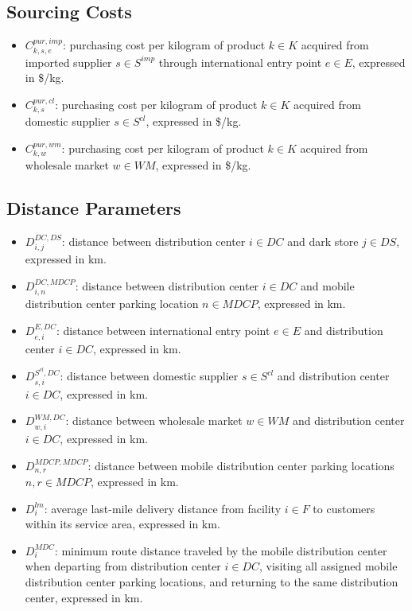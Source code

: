 \documentclass[12pt]{article}
\begin{document}
\subsection{Sourcing Costs}

\begin{itemize}
    \item $C^{pur,imp}_{k,s,e}$: purchasing cost per kilogram of product $k \in K$ acquired from imported supplier $s \in S^{imp}$ through international entry point $e \in E$, expressed in \$/kg.

    \item $C^{pur,cl}_{k,s}$: purchasing cost per kilogram of product $k \in K$ acquired from domestic supplier $s \in S^{cl}$, expressed in \$/kg.

    \item $C^{pur,wm}_{k,w}$: purchasing cost per kilogram of product $k \in K$ acquired from wholesale market $w \in WM$, expressed in \$/kg.
\end{itemize}

\subsection{Distance Parameters}

\begin{itemize}
    \item $D^{DC,DS}_{i,j}$: distance between distribution center $i \in DC$ and dark store $j \in DS$, expressed in km.

    \item $D^{DC,MDCP}_{i,n}$: distance between distribution center $i \in DC$ and mobile distribution center parking location $n \in MDCP$, expressed in km.

    \item $D^{E,DC}_{e,i}$: distance between international entry point $e \in E$ and distribution center $i \in DC$, expressed in km.

    \item $D^{S^{cl},DC}_{s,i}$: distance between domestic supplier $s \in S^{cl}$ and distribution center $i \in DC$, expressed in km.

    \item $D^{WM,DC}_{w,i}$: distance between wholesale market $w \in WM$ and distribution center $i \in DC$, expressed in km.

    \item $D^{MDCP,MDCP}_{n,r}$: distance between mobile distribution center parking locations $n,r \in MDCP$, expressed in km.

    \item $D^{lm}_{i}$: average last-mile delivery distance from facility $i \in F$ to customers within its service area, expressed in km.
    
    \item $D^{MDC}_{i}$: minimum route distance traveled by the mobile distribution center when departing from distribution center $i \in DC$, visiting all assigned mobile distribution center parking locations, and returning to the same distribution center, expressed in km.
\end{itemize}
\end{document}
